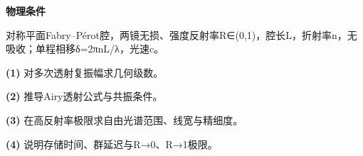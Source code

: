 \textbf{物理条件}\par 对称平面Fabry–Pérot腔，两镜无损、强度反射率R∈(0,1)，腔长L，折射率n，无吸收；单程相移δ=2πnL/λ，光速c。
\par\noindent\textbf{(1)} 对多次透射复振幅求几何级数。
\par\noindent\textbf{(2)} 推导Airy透射公式与共振条件。
\par\noindent\textbf{(3)} 在高反射率极限求自由光谱范围、线宽与精细度。
\par\noindent\textbf{(4)} 说明存储时间、群延迟与R→0、R→1极限。

